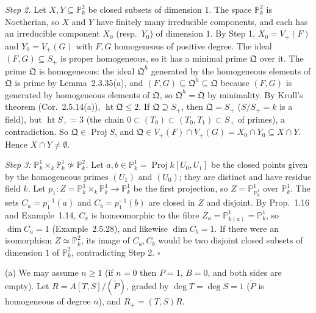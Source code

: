 \documentclass[11pt]{article}
\begin{document}
\emph{Step 2.} Let $X,Y\subseteq\mathbb{P}^2_k$ be closed subsets of dimension $1$. The space $\mathbb{P}^2_k$ is Noetherian, so $X$ and $Y$ have finitely many irreducible components, and each has an irreducible component $X_0$ (resp.\ $Y_0$) of dimension $1$. By Step 1, $X_0=V_+(F)$ and $Y_0=V_+(G)$ with $F,G$ homogeneous of positive degree. The ideal $(F,G)\subseteq S_+$ is proper homogeneous, so it has a minimal prime $\mathfrak Q$ over it. The prime $\mathfrak Q$ is homogeneous: the ideal $\mathfrak Q^h$ generated by the homogeneous elements of $\mathfrak Q$ is prime by Lemma~2.3.35(a), and $(F,G)\subseteq\mathfrak Q^h\subseteq\mathfrak Q$ because $(F,G)$ is generated by homogeneous elements of $\mathfrak Q$, so $\mathfrak Q^h=\mathfrak Q$ by minimality. By Krull's theorem (Cor.~2.5.14(a)), $\operatorname{ht}\mathfrak Q\le2$. If $\mathfrak Q\supseteq S_+$, then $\mathfrak Q=S_+$ ($S/S_+=k$ is a field), but $\operatorname{ht}S_+=3$ (the chain $0\subset(T_0)\subset(T_0,T_1)\subset S_+$ of primes), a contradiction. So $\mathfrak Q\in\operatorname{Proj}S$, and $\mathfrak Q\in V_+(F)\cap V_+(G)=X_0\cap Y_0\subseteq X\cap Y$. Hence $X\cap Y\neq\emptyset$.

\emph{Step 3: $\mathbb{P}^1_k\times_k\mathbb{P}^1_k\not\simeq\mathbb{P}^2_k$.} Let $a,b\in\mathbb{P}^1_k=\operatorname{Proj}k[U_0,U_1]$ be the closed points given by the homogeneous primes $(U_1)$ and $(U_0)$; they are distinct and have residue field $k$. Let $p_1:Z=\mathbb{P}^1_k\times_k\mathbb{P}^1_k\to\mathbb{P}^1_k$ be the first projection, so $Z=\mathbb{P}^1_{\mathbb{P}^1_k}$ over $\mathbb{P}^1_k$. The sets $C_a=p_1^{-1}(a)$ and $C_b=p_1^{-1}(b)$ are closed in $Z$ and disjoint. By Prop.~1.16 and Example~1.14, $C_a$ is homeomorphic to the fibre $Z_a=\mathbb{P}^1_{k(a)}=\mathbb{P}^1_k$, so $\dim C_a=1$ (Example~2.5.28), and likewise $\dim C_b=1$. If there were an isomorphism $Z\simeq\mathbb{P}^2_k$, its image of $C_a,C_b$ would be two disjoint closed subsets of dimension $1$ of $\mathbb{P}^2_k$, contradicting Step 2. \hfill$\square$

\pf
(a) We may assume $n\ge1$ (if $n=0$ then $P=1$, $B=0$, and both sides are empty). Let $R=A[T,S]/(\tilde P)$, graded by $\deg T=\deg S=1$ ($\tilde P$ is homogeneous of degree $n$), and $R_+=(T,S)R$.
\end{document}
